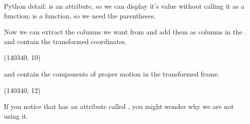 \documentclass[letterpaper,10pt,english]{sphinxmanual}
\begin{document}
Python detail:  is an attribute, so we can display it’s value without calling it as a function;  is a function, so we need the parentheses.

Now we can extract the columns we want from  and add them as columns in the .   and  contain the transformed coordinates.

\begin{sphinxVerbatim}[commandchars=\\\{\}]
\PYG{p}{[}\PYG{p}{]}  
\PYG{p}{[}\PYG{p}{]}  
\end{sphinxVerbatim}

\begin{sphinxVerbatim}[commandchars=\\\{\}]
(140340, 10)
\end{sphinxVerbatim}

 and  contain the components of proper motion in the transformed frame.

\begin{sphinxVerbatim}[commandchars=\\\{\}]
\PYG{p}{[}\PYG{p}{]}  
\PYG{p}{[}\PYG{p}{]}  
\end{sphinxVerbatim}

\begin{sphinxVerbatim}[commandchars=\\\{\}]
(140340, 12)
\end{sphinxVerbatim}

 If you notice that  has an attribute called , you might wonder why we are not using it.
\end{document}
